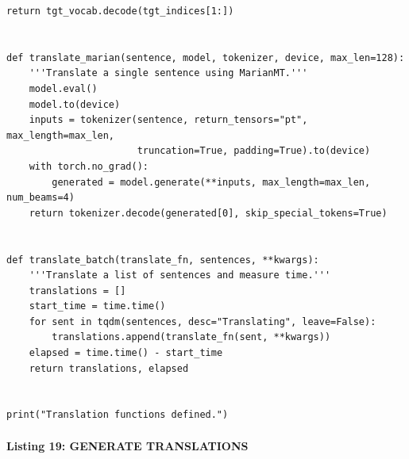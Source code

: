 \documentclass[12pt,a4paper,oneside]{report}
\begin{document}
\begin{Verbatim}[commandchars=\\\{\},breaklines=true,breakanywhere=true,fontsize=\scriptsize,frame=leftline,framesep=2mm,rulecolor=\color{gray}]
    return tgt_vocab.decode(tgt_indices[1:])


def translate_marian(sentence, model, tokenizer, device, max_len=128):
    '''Translate a single sentence using MarianMT.'''
    model.eval()
    model.to(device)
    inputs = tokenizer(sentence, return_tensors="pt", max_length=max_len,
                       truncation=True, padding=True).to(device)
    with torch.no_grad():
        generated = model.generate(**inputs, max_length=max_len, num_beams=4)
    return tokenizer.decode(generated[0], skip_special_tokens=True)


def translate_batch(translate_fn, sentences, **kwargs):
    '''Translate a list of sentences and measure time.'''
    translations = []
    start_time = time.time()
    for sent in tqdm(sentences, desc="Translating", leave=False):
        translations.append(translate_fn(sent, **kwargs))
    elapsed = time.time() - start_time
    return translations, elapsed


print("Translation functions defined.")
\end{Verbatim}
\paragraph{Listing 19: GENERATE TRANSLATIONS}\mbox{}\\[-1ex]
\end{document}
